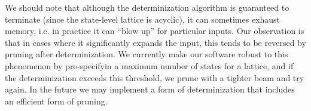 \documentclass{article}
\begin{document}
We should note that although the determinization algorithm
is guaranteed to terminate (since the state-level lattice is acyclic), it can
sometimes exhaust memory, i.e. in practice it can ``blow up'' for particular 
inputs.  Our observation is that in cases where it significantly expands
the input, this tends to be reversed by pruning after determinization.
We currently make our software robust to this phenomenon by 
pre-specifyin a maximum number of states for a lattice, and if the
determinization exceeds this threshold, we prune with a tighter beam
and try again.  In the future we may implement a form of determinization that
includes an efficient form of pruning.




\end{document}

